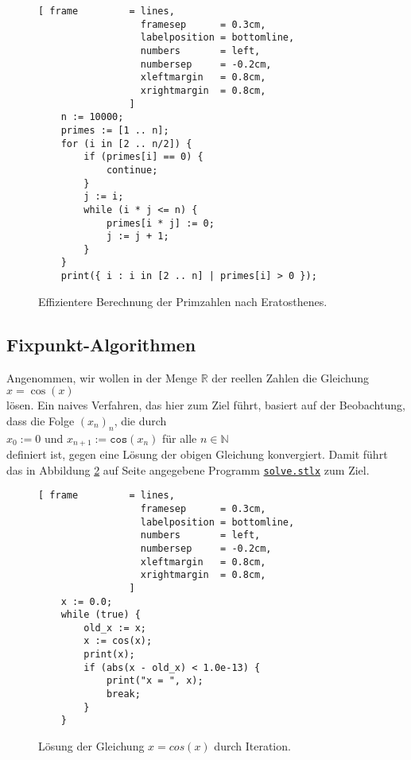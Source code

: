 \begin{figure}[!ht]
  \centering
\begin{Verbatim}[ frame         = lines, 
                  framesep      = 0.3cm, 
                  labelposition = bottomline,
                  numbers       = left,
                  numbersep     = -0.2cm,
                  xleftmargin   = 0.8cm,
                  xrightmargin  = 0.8cm,
                ]
    n := 10000;
    primes := [1 .. n];
    for (i in [2 .. n/2]) {
        if (primes[i] == 0) {
            continue;
        }
        j := i;
        while (i * j <= n) {
            primes[i * j] := 0;
            j := j + 1;
        }
    }
    print({ i : i in [2 .. n] | primes[i] > 0 });
\end{Verbatim} 
\vspace*{-0.3cm}
\caption{Effizientere Berechnung der Primzahlen nach Eratosthenes.}  \label{fig:primes-eratosthenes.stlx}
\end{figure} %


\subsection{Fixpunkt-Algorithmen}
Angenommen, wir wollen in der Menge $\mathbb{R}$ der reellen Zahlen die
Gleichung \\[0.2cm]
\hspace*{1.3cm} $x = \cos(x)$ \\[0.2cm]
l\"{o}sen.  Ein naives Verfahren, das hier zum Ziel f\"{u}hrt, basiert auf der
Beobachtung, dass die Folge $(x_n)_n$, die durch \\[0.2cm]
\hspace*{1.3cm} $x_0 := 0$ und $x_{n+1} := \mathtt{cos}(x_n)$ f\"{u}r alle $n \in \mathbb{N}$ \\[0.2cm]
definiert ist, gegen eine L\"{o}sung der obigen Gleichung konvergiert.  Damit f\"{u}hrt das in
Abbildung \ref{fig:solve.stlx} auf Seite \pageref{fig:solve.stlx} angegebene Programm
\href{https://github.com/karlstroetmann/Logik/blob/master/SetlX/solve.stlx}{\texttt{solve.stlx}}
zum Ziel.

\begin{figure}[!ht]
  \centering
\begin{Verbatim}[ frame         = lines, 
                  framesep      = 0.3cm, 
                  labelposition = bottomline,
                  numbers       = left,
                  numbersep     = -0.2cm,
                  xleftmargin   = 0.8cm,
                  xrightmargin  = 0.8cm,
                ]
    x := 0.0;
    while (true) {
        old_x := x;
        x := cos(x);    
        print(x);
        if (abs(x - old_x) < 1.0e-13) {
            print("x = ", x);
            break;
        }   
    }
\end{Verbatim} 
\vspace*{-0.3cm}
\caption{L\"{o}sung der Gleichung $x = cos(x)$ durch Iteration.}  \label{fig:solve.stlx}
\end{figure} %

